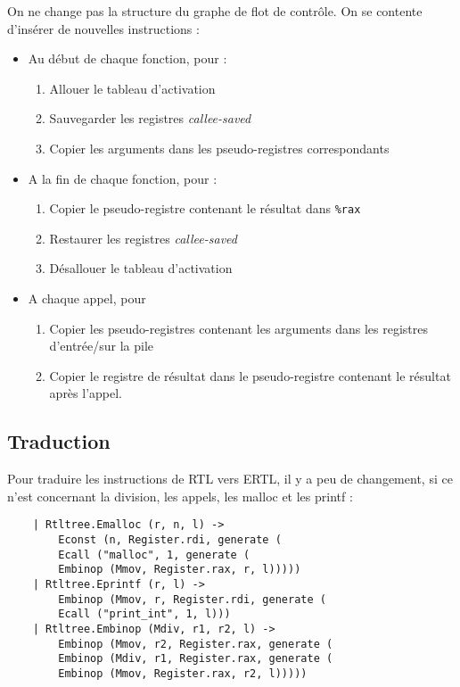 \documentclass{cours}
\begin{document}
On ne change pas la structure du graphe de flot de contrôle. On se contente d'insérer de nouvelles instructions :
\begin{itemize}
    \item Au début de chaque fonction, pour :
          \begin{enumerate}
              \item Allouer le tableau d'activation
              \item Sauvegarder les registres \textit{callee-saved}
              \item Copier les arguments dans les pseudo-registres correspondants
          \end{enumerate}
    \item A la fin de chaque fonction, pour :
          \begin{enumerate}
              \item Copier le pseudo-registre contenant le résultat dans \texttt{\%rax}
              \item Restaurer les registres \textit{callee-saved}
              \item Désallouer le tableau d'activation
          \end{enumerate}
    \item A chaque appel, pour
          \begin{enumerate}
              \item Copier les pseudo-registres contenant les arguments dans les registres d'entrée/sur la pile
              \item Copier le registre de résultat dans le pseudo-registre contenant le résultat après l'appel.
          \end{enumerate}
\end{itemize}

\subsection{Traduction}
Pour traduire les instructions de RTL vers ERTL, il y a peu de changement, si ce n'est concernant la division, les appels, les malloc et les printf :
\begin{verbatim}
    | Rtltree.Emalloc (r, n, l) ->
        Econst (n, Register.rdi, generate (
        Ecall ("malloc", 1, generate (
        Embinop (Mmov, Register.rax, r, l)))))
    | Rtltree.Eprintf (r, l) ->
        Embinop (Mmov, r, Register.rdi, generate (
        Ecall ("print_int", 1, l)))
    | Rtltree.Embinop (Mdiv, r1, r2, l) ->
        Embinop (Mmov, r2, Register.rax, generate (
        Embinop (Mdiv, r1, Register.rax, generate (
        Embinop (Mmov, Register.rax, r2, l)))))
\end{verbatim}
\end{document}

